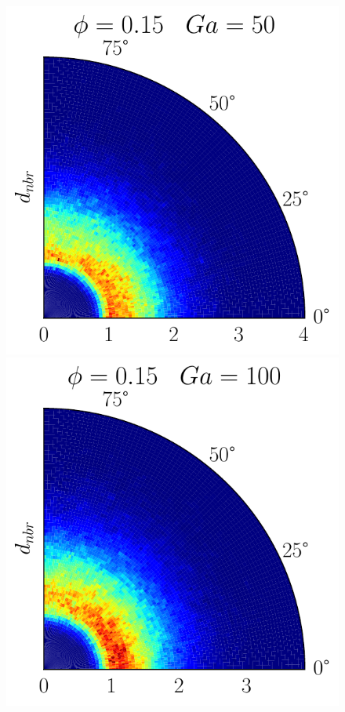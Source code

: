 \begin{figure}[h!]
    \includegraphics[height =\size]{image/N_10/beta/2DMAP_theta_distmin_dmin_10_Bo1PHI0_15mu_r0_42Ga50.pdf}
    \includegraphics[height =\size]{image/N_10/beta/2DMAP_theta_distmin_dmin_10_Bo1PHI0_15mu_r0_42Ga100.pdf}

\end{figure}
